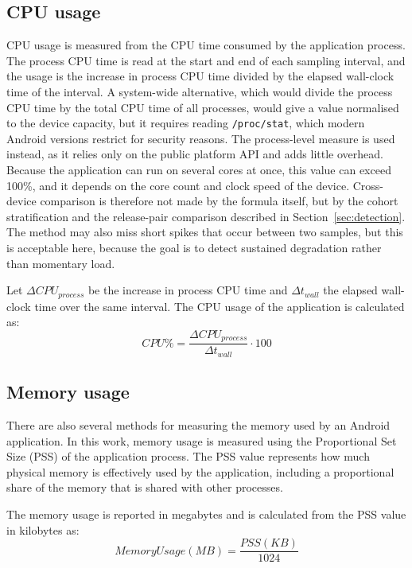\subsection{CPU usage}

CPU usage is measured from the CPU time consumed by the application process. The process CPU time is read at the start and end of each sampling interval, and the usage is the increase in process CPU time divided by the elapsed wall-clock time of the interval. A system-wide alternative, which would divide the process CPU time by the total CPU time of all processes, would give a value normalised to the device capacity, but it requires reading \texttt{/proc/stat}, which modern Android versions restrict for security reasons. The process-level measure is used instead, as it relies only on the public platform API and adds little overhead. Because the application can run on several cores at once, this value can exceed 100\%, and it depends on the core count and clock speed of the device. Cross-device comparison is therefore not made by the formula itself, but by the cohort stratification and the release-pair comparison described in Section~\ref{sec:detection}. The method may also miss short spikes that occur between two samples, but this is acceptable here, because the goal is to detect sustained degradation rather than momentary load.

Let $\Delta CPU_{process}$ be the increase in process CPU time and $\Delta t_{wall}$ the elapsed wall-clock time over the same interval. The CPU usage of the application is calculated as:
\begin{equation}
    CPU\% = \frac{\Delta CPU_{process}}{\Delta t_{wall}} \cdot 100
\end{equation}

\subsection{Memory usage}

There are also several methods for measuring the memory used by an Android application. In this work, memory usage is measured using the Proportional Set Size (PSS) of the application process. The PSS value represents how much physical memory is effectively used by the application, including a proportional share of the memory that is shared with other processes.

The memory usage is reported in megabytes and is calculated from the PSS value in kilobytes as:
\begin{equation}
    MemoryUsage(MB) = \frac{PSS(KB)}{1024}
\end{equation}

